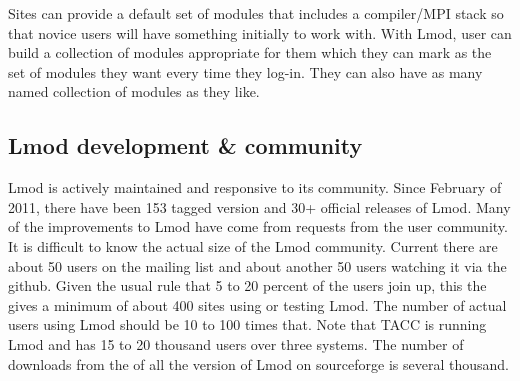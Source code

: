 Sites can provide a default set of modules that includes a
compiler/MPI stack so that novice users will have something initially
to work with.  With Lmod, user can build a collection of modules
appropriate for them which they can mark as the set of modules they
want every time they log-in.  They can also have as many named
collection of modules as they like.


\subsection{Lmod development \& community}

Lmod is actively maintained and responsive to its community.  Since
February of 2011, there have been 153 tagged version and 30+ official
releases of Lmod.  Many of the improvements to Lmod have come from
requests from the user community.  It is difficult to know the actual
size of the Lmod community.  Current there are about 50 users on the
mailing list and about another 50 users watching it via the github.
Given the usual rule that 5 to 20 percent of the users join up, this
the gives a minimum of about 400 sites using or testing Lmod.  The
number of actual users using Lmod should be 10 to 100 times that.
Note that TACC is running Lmod and has 15 to 20 thousand users over
three systems.  The number of downloads from the of all the version of
Lmod on sourceforge is several thousand.

%
